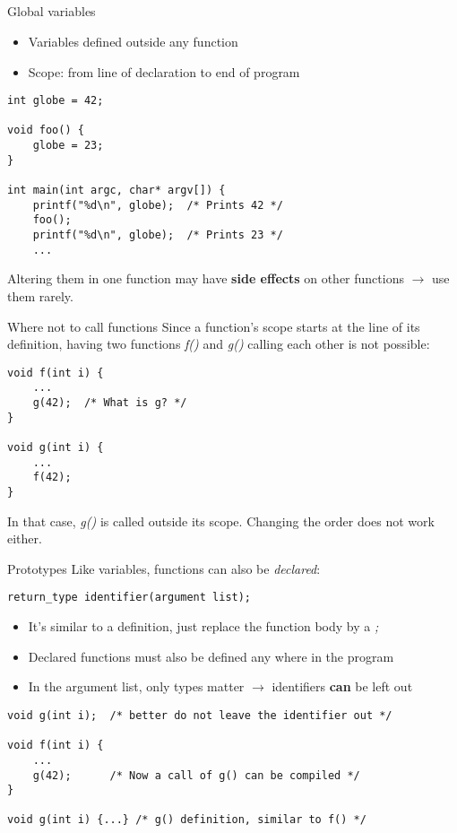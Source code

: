 \subsection{}
\begin{frame}[fragile]{Global variables}
	\begin{itemize}
		\item Variables defined outside any function
		\item Scope: from line of declaration to end of program
	\end{itemize}
	\begin{lstlisting}
int globe = 42;

void foo() {
	globe = 23;
}

int main(int argc, char* argv[]) {
	printf("%d\n", globe);	/* Prints 42 */
	foo();
	printf("%d\n", globe);	/* Prints 23 */
	...
\end{lstlisting}
	Altering them in one function may have \textbf{side effects} on other functions $\rightarrow$ use them rarely.
\end{frame}
\begin{frame}[fragile]{Where not to call functions}
	Since a function's scope starts at the line of its definition, having two functions \textit{f()} and \textit{g()} calling each other is not possible:
	\begin{lstlisting}
void f(int i) {
	...
	g(42);	/* What is g? */
}

void g(int i) {
	...
	f(42);
}
\end{lstlisting}
	In that case, \textit{g()} is called outside its scope. Changing the order does not work either.
\end{frame}
\begin{frame}[fragile]{Prototypes}
	Like variables, functions can also be \textit{declared}:
	\begin{lstlisting}[numbers=none,basicstyle=\itshape\footnotesize]
return_type identifier(argument list);
\end{lstlisting}
	\begin{itemize}
		\item It's similar to a definition, just replace the function body by a \textit{;}
		\item Declared functions must also be defined any where in the program
		\item In the argument list, only types matter $\rightarrow$ identifiers \textbf{can} be left out
	\end{itemize}
	\begin{lstlisting}
void g(int i);	/* better do not leave the identifier out */

void f(int i) {
	...
	g(42);		/* Now a call of g() can be compiled */
}

void g(int i) {...}	/* g() definition, similar to f() */
\end{lstlisting}
\end{frame}
